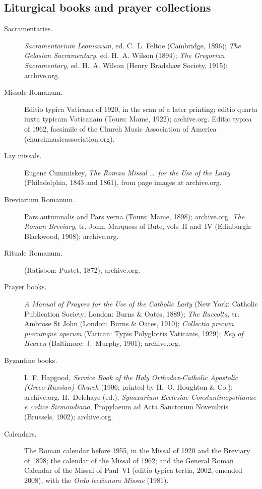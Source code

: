 \subsection*{Liturgical books and prayer collections}
\begin{description}
\item[Sacramentaries.] \emph{Sacramentarium Leonianum}, ed. C.~L. Feltoe
  (Cambridge, 1896); \emph{The Gelasian Sacramentary}, ed. H.~A. Wilson
  (1894); \emph{The Gregorian Sacramentary}, ed. H.~A. Wilson (Henry
  Bradshaw Society, 1915); archive.org.
\item[Missale Romanum.] Editio typica Vaticana of 1920, in the scan of a
  later printing; editio quarta iuxta typicam Vaticanam (Tours: Mame,
  1922); archive.org. Editio typica of 1962, facsimile of the Church Music
  Association of America (churchmusicassociation.org).
\item[Lay missals.] Eugene Cummiskey, \emph{The Roman Missal \ldots\ for
  the Use of the Laity} (Philadelphia, 1843 and 1861), from page images at
  archive.org.
\item[Breviarium Romanum.] Pars autumnalis and Pars verna (Tours: Mame,
  1898); archive.org. \emph{The Roman Breviary}, tr. John, Marquess of
  Bute, vols~II and~IV (Edinburgh: Blackwood, 1908); archive.org.
\item[Rituale Romanum.] (Ratisbon: Pustet, 1872); archive.org.
\item[Prayer books.] \emph{A Manual of Prayers for the Use of the Catholic
  Laity} (New York: Catholic Publication Society; London: Burns \& Oates,
  1889); \emph{The Raccolta}, tr. Ambrose St John (London: Burns \& Oates,
  1910); \emph{Collectio precum piorumque operum} (Vatican: Typis
  Polyglottis Vaticanis, 1929); \emph{Key of Heaven} (Baltimore: J.~Murphy,
  1901); archive.org.
\item[Byzantine books.] I.~F. Hapgood, \emph{Service Book of the Holy
  Orthodox-Catholic Apostolic (Greco-Russian) Church} (1906; printed by
  H.~O. Houghton \& Co.); archive.org. H.~Delehaye (ed.),
  \emph{Synaxarium Ecclesiae Constantinopolitanae e codice Sirmondiano},
  Propylaeum ad Acta Sanctorum Novembris (Brussels, 1902); archive.org.
\item[Calendars.] The Roman calendar before 1955, in the Missal of 1920
  and the Breviary of 1898; the calendar of the Missal of 1962; and the
  General Roman Calendar of the Missal of Paul~VI (editio typica tertia,
  2002, emended 2008), with the \emph{Ordo lectionum Missae} (1981).
\end{description}

